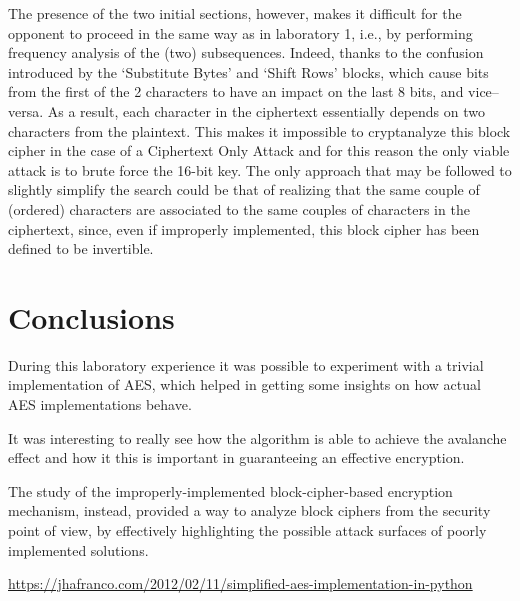 \documentclass[12pt]{article}
\begin{document}
The presence of the two initial sections, however, makes it difficult for the opponent to proceed in the same way as in laboratory 1, i.e., by performing frequency analysis of the (two) subsequences. Indeed, thanks to the confusion introduced by the `Substitute Bytes' and `Shift Rows' blocks, which cause bits from the first of the 2 characters to have an impact on the last 8 bits, and vice–versa.
As a result, each character in the ciphertext essentially depends on two characters from the plaintext.
This makes it impossible to cryptanalyze this block cipher in the case of a Ciphertext Only Attack and for this reason the only viable attack is to brute force the 16-bit key.
The only approach that may be followed to slightly simplify the search could be that of realizing that the same couple of (ordered) characters are associated to the same couples of characters in the ciphertext, since, even if improperly implemented, this block cipher has been defined to be invertible.


\section{Conclusions}
\label{sec:04}

During this laboratory experience it was possible to experiment with a trivial implementation of AES, which helped in getting some insights on how actual AES implementations behave.

It was interesting to really see how the algorithm is able to achieve the avalanche effect and how it this is important in guaranteeing an effective encryption.

The study of the improperly-implemented block-cipher-based encryption mechanism, instead, provided a way to analyze block ciphers from the security point of view, by effectively highlighting the possible attack surfaces of poorly implemented solutions.

\begin{thebibliography}{5}
    \url{https://jhafranco.com/2012/02/11/simplified-aes-implementation-in-python}
\end{thebibliography}
\end{document}
